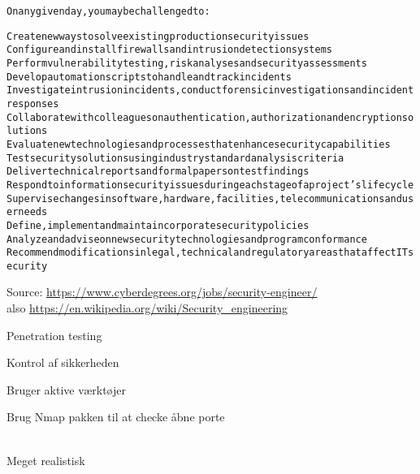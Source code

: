 \documentclass[20pt,landscape,a4paper,footrule]{foils}
\begin{document}

\begin{alltt}\small
On any given day, you may be challenged to:

	Create new ways to solve existing production security issues
	Configure and install firewalls and intrusion detection systems
	Perform vulnerability testing, risk analyses and security assessments
	Develop automation scripts to handle and track incidents
	Investigate intrusion incidents, conduct forensic investigations and incident responses
	Collaborate with colleagues on authentication, authorization and encryption solutions
	Evaluate new technologies and processes that enhance security capabilities
	Test security solutions using industry standard analysis criteria
	Deliver technical reports and formal papers on test findings
	Respond to information security issues during each stage of a project’s lifecycle
	Supervise changes in software, hardware, facilities, telecommunications and user needs
	Define, implement and maintain corporate security policies
	Analyze and advise on new security technologies and program conformance
	Recommend modifications in legal, technical and regulatory areas that affect IT security
\end{alltt}

Source: \url{https://www.cyberdegrees.org/jobs/security-engineer/}\\
also
\url{https://en.wikipedia.org/wiki/Security_engineering}


\begin{list1}
\item Penetration testing
\item Kontrol af sikkerheden
\item Bruger aktive værktøjer
\item Brug Nmap pakken til at checke åbne porte
\end{list1}



\\
Meget realistisk 


\end{document}
